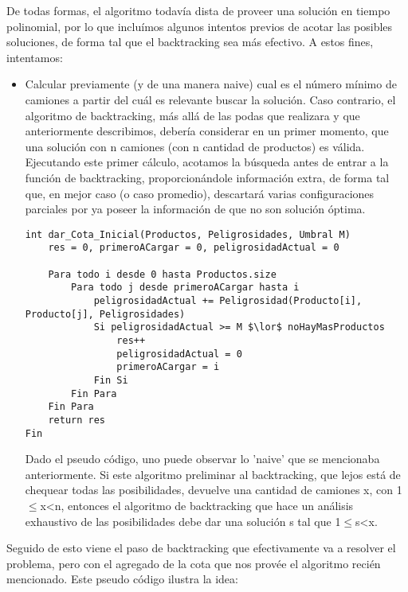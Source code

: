De todas formas, el algoritmo todavía dista de proveer una solución en tiempo polinomial, por lo que incluímos algunos intentos previos de acotar las posibles soluciones, de forma tal que el backtracking sea más efectivo. A estos fines, intentamos:

\begin{itemize}

\item Calcular previamente (y de una manera naive) cual es el número mínimo de camiones a partir del cuál es relevante buscar la solución. Caso contrario, el algoritmo de backtracking, más allá de las podas que realizara y que anteriormente describimos, debería considerar en un primer momento, que una solución con n camiones (con n cantidad de productos) es válida. Ejecutando este primer cálculo, acotamos la búsqueda antes de entrar a la función de backtracking, proporcionándole información extra, de forma tal que, en mejor caso (o caso promedio), descartará varias configuraciones parciales por ya poseer la información de que no son solución óptima.

\begin{lstlisting}[mathescape]
int dar_Cota_Inicial(Productos, Peligrosidades, Umbral M)
	res = 0, primeroACargar = 0, peligrosidadActual = 0
	
	Para todo i desde 0 hasta Productos.size
		Para todo j desde primeroACargar hasta i
			peligrosidadActual += Peligrosidad(Producto[i], Producto[j], Peligrosidades)
			Si peligrosidadActual >= M $\lor$ noHayMasProductos
				res++
				peligrosidadActual = 0
				primeroACargar = i
			Fin Si
		Fin Para
	Fin Para
	return res
Fin
\end{lstlisting}

Dado el pseudo código, uno puede observar lo 'naive' que se mencionaba anteriormente. Si este algoritmo \noindent preliminar al backtracking, que lejos está de chequear todas las posibilidades, devuelve una cantidad de camiones x, con 1$\leq$x\textless n, entonces el algoritmo de backtracking que hace un análisis exhaustivo de las posibilidades debe dar una solución s tal que 1$\leq$s\textless x.

\end{itemize}

Seguido de esto viene el paso de backtracking que efectivamente va a resolver el problema, pero con el agregado de la cota que nos provée el algoritmo recién mencionado. Este pseudo código ilustra la idea:

